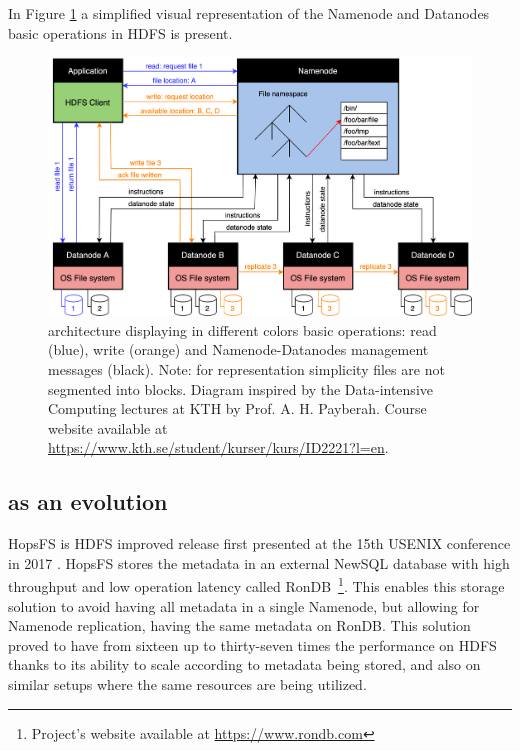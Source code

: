 In Figure \ref{fig:hdfs} a simplified visual representation of the Namenode and Datanodes basic operations in \gls{HDFS} is present.

\begin{figure}[!ht]
    \begin{center}
      \includegraphics[width=\textwidth]{figures/2-background/HDFS.png}
    \end{center}
    \caption[Hadoop Distributed File System architecture]{ architecture displaying in different colors basic operations: read (blue), write (orange) and Namenode-Datanodes management messages (black). Note: for representation simplicity files are not segmented into blocks. Diagram inspired by the Data-intensive Computing lectures at KTH by Prof. A. H. Payberah. Course website available at \url{https://www.kth.se/student/kurser/kurs/ID2221?l=en}.}
    \label{fig:hdfs}
\end{figure}
 
\subsection{ as an  evolution}

\gls{HopsFS} is \gls{HDFS} improved release first presented at the 15th USENIX conference in 2017 \cite{niaziHopsFSScalingHierarchical2017}. \gls{HopsFS} stores the metadata in an external NewSQL database with high throughput and low operation latency called RonDB~\footnote{Project's website available at \url{https://www.rondb.com}}. This enables this storage solution to avoid having all metadata in a single Namenode, but allowing for Namenode replication, having the same metadata on RonDB. This solution proved to have from sixteen up to thirty-seven times the performance on \gls{HDFS} thanks to its ability to scale according to metadata being stored, and also on similar setups where the same resources are being utilized. 


